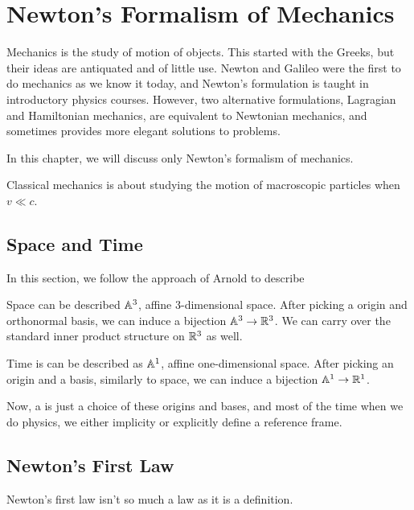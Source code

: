\chapter{Newton's Formalism of Mechanics}

Mechanics is the study of motion of objects. This started with the Greeks, but their ideas are antiquated and of little use. Newton and Galileo were the first to do mechanics as we know it today, and Newton's formulation is taught in introductory physics courses. However, two alternative formulations, Lagragian and Hamiltonian mechanics, are equivalent to Newtonian mechanics, and sometimes provides more elegant solutions to problems.

In this chapter, we will discuss only Newton's formalism of mechanics.

Classical mechanics is about studying the motion of macroscopic particles when $v \ll c$. 

\section{Space and Time}

In this section, we follow the approach of Arnold to describe 

Space can be described $\mathbb A^3$, affine 3-dimensional space. After picking a  origin and orthonormal basis, we can induce a bijection $\mathbb A^3 \to \mathbb R^3$. We can carry over the standard inner product structure on $\mathbb R^3$ as well.

Time is can be described as $\mathbb A^1$, affine one-dimensional space. After picking an origin and a basis, similarly to space, we can induce a bijection $\mathbb A^1 \to \mathbb R^1$.

Now, a  is just a choice of these origins and bases, and most of the time when we do physics, we either implicity or explicitly define a reference frame. 

\section{Newton's First Law}

Newton's first law isn't so much a law as it is a definition.